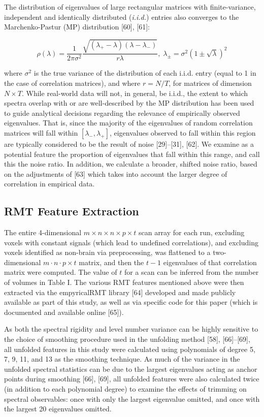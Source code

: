 The distribution of eigenvalues of large rectangular matrices with finite-variance, independent and
identically distributed (\textit{i.i.d.}) entries also converges to the Marchenko-Pastur (MP) distribution
[60], [61]:

\[
\rho(\lambda) =
\frac{1}{2\pi\sigma^2}
\frac{\sqrt{(\lambda_+ - \lambda)(\lambda - \lambda_-)}}{r\lambda}, \;
\lambda_{\pm} = \sigma^2\left(1 \pm \sqrt{\lambda}\right)^2
\]

where \(\sigma^2\) is the true variance of the distribution of each i.i.d. entry (equal to 1 in the
case of correlation matrices), and where \(r = N / T\), for matrices of dimension \(N \times T\).
While real-world data will not, in general, be i.i.d., the extent to which spectra overlap with or
are well-described by the MP distribution has been used to guide analytical decisions regarding the
relevance of empirically observed eigenvalues. That is, since the majority of the eigenvalues of
random correlation matrices will fall within \([\lambda_{-}, \lambda_{+}]\), eigenvalues observed to
fall within this region are typically considered to be the result of noise [29]–[31], [62]. We
examine as a potential feature the proportion of eigenvalues that fall within this range, and call
this the noise ratio. In addition, we calculate a broader, shifted noise ratio, based on the
adjustments of [63] which takes into account the larger degree of correlation in empirical data.

\subsection{RMT Feature Extraction}
The entire 4-dimensional \(m \times n \times n \times p \times t\) scan array for each run,
excluding voxels with constant signals (which lead to undefined correlations), and excluding voxels
identified as non-brain via preprocessing, was flattened to a two-dimensional \(m \cdot n \cdot p
\times t\) matrix, and then the \(t - 1\) eigenvalues of that correlation matrix were computed. The
value of \(t\) for a scan can be inferred from the number of volumes in Table I. The various RMT
features mentioned above were then extracted via the empyricalRMT library [64] developed and made
publicly available as part of this study, as well as via specific code for this paper (which is
documented and available online [65]).

As both the spectral rigidity and level number variance can be highly sensitive to the choice of
smoothing procedure used in the unfolding method [58], [66]–[69], all unfolded features in this
study were calculated using polynomials of degree 5, 7, 9, 11, and 13 as the smoothing technique. As
much of the variance in the unfolded spectral statistics can be due to the largest eigenvalues
acting as anchor points during smoothing [66], [69], all unfolded features were also calculated
twice (in addition to each polynomial degree) to examine the effects of trimming on spectral
observables: once with only the largest eigenvalue omitted, and once with the largest 20 eigenvalues
omitted.

